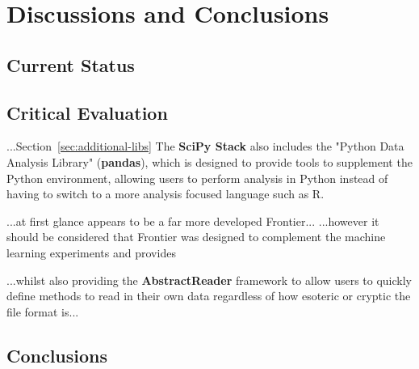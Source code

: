 \part{Discussions and Conclusions}
\chapter{Current Status}

\chapter{Critical Evaluation}

...Section~\ref{sec:additional-libs}
The \textbf{SciPy Stack} also includes the "Python Data Analysis Library"
(\textbf{pandas}), which is designed to provide tools to supplement the Python
environment, allowing users to perform analysis in Python instead of having to
switch to a more analysis focused language such as R.

...at first glance appears to be a far more developed Frontier...
...however it should be considered that Frontier was designed to complement the
machine learning experiments and provides 

...whilst also providing the \textbf{AbstractReader} framework to allow users to
quickly define methods to read in their own data regardless of how esoteric or
cryptic the file format is...



\chapter{Conclusions}

